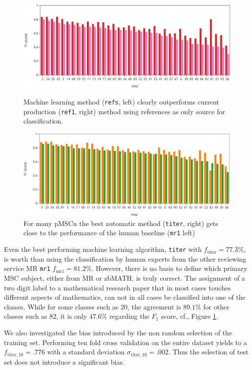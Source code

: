 \begin{figure}[t]
  \centering
  \includegraphics[width=1\textwidth]{ref1-refs.png}
  \caption{Machine learning method (\texttt{refs}, left)  clearly outperforms current production (\texttt{ref1}, right) method using references as only source for classification.}\label{fgRefs}
  \includegraphics[width=1\textwidth]{mr1-titer.png}
  \caption{For many pMSCn the best automatic method (\texttt{titer}, right) gets close to the performance of the human baseline (\texttt{mr1} left)}\label{fgHum}
\end{figure}
Even the best performing machine learning algorithm, \texttt{titer} with $f_\mathrm{titer}=77.3\%$, is worth than using the classification by human experts from the other reviewing service MR \texttt{mr1} $f_\mathrm{mr1}=81.2\%.$ 
However, there is no basis to define which primary MSC subject, either from MR or zbMATH, is truly correct.
The assignment of a two digit label to a mathematical research paper that in most cases touches different aspects of mathematics, can not in all cases be classified into one of the classes.
While for some classes such as 20, the agreement is $89.1\%$ for other classes such as 82, it is only $47.6\%$ regarding the $F_1$ score, cf., Figure \ref{fgHum}.

We also investigated the bias introduced by the non random selection of the training set.
Performing ten fold cross validation on the entire dataset yields to a $f_\mathrm{titer,10}=.776$ with a standard deviation $\sigma_\mathrm{titer,10}=.002.$
Thus the selection of test set does not introduce a significant bias.

